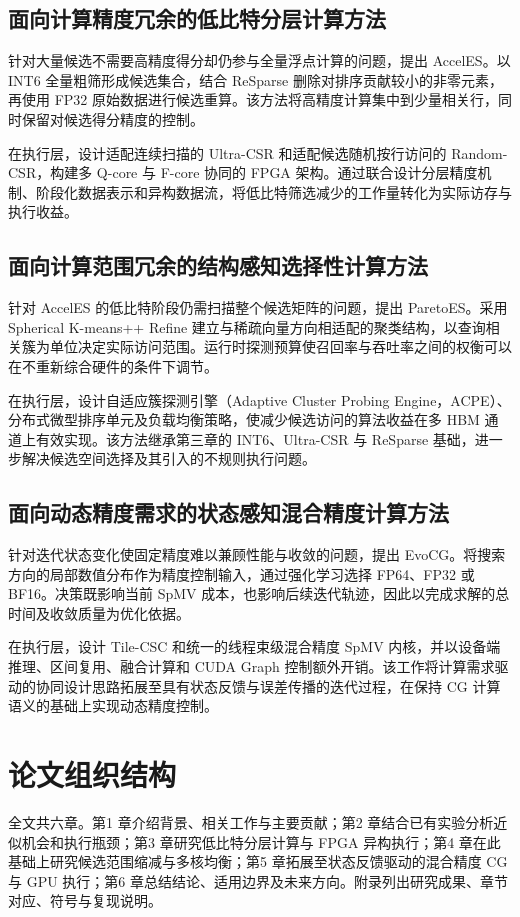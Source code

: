 \subsection{面向计算精度冗余的低比特分层计算方法}
针对大量候选不需要高精度得分却仍参与全量浮点计算的问题，提出 AccelES\cite{jqzhai2025AccelES}。以 INT6 全量粗筛形成候选集合，结合 ReSparse 删除对排序贡献较小的非零元素，再使用 FP32 原始数据进行候选重算。该方法将高精度计算集中到少量相关行，同时保留对候选得分精度的控制。

在执行层，设计适配连续扫描的 Ultra-CSR 和适配候选随机按行访问的 Random-CSR，构建多 Q-core 与 F-core 协同的 FPGA 架构。通过联合设计分层精度机制、阶段化数据表示和异构数据流，将低比特筛选减少的工作量转化为实际访存与执行收益。

\subsection{面向计算范围冗余的结构感知选择性计算方法}
针对 AccelES 的低比特阶段仍需扫描整个候选矩阵的问题，提出 ParetoES\cite{paretoes2026}。采用 Spherical K-means++ Refine 建立与稀疏向量方向相适配的聚类结构，以查询相关簇为单位决定实际访问范围。运行时探测预算使召回率与吞吐率之间的权衡可以在不重新综合硬件的条件下调节。

在执行层，设计自适应簇探测引擎（Adaptive Cluster Probing Engine，ACPE）、分布式微型排序单元及\hbalance{}负载均衡策略，使减少候选访问的算法收益在多 HBM 通道上有效实现。该方法继承第三章的 INT6、Ultra-CSR 与 ReSparse 基础，进一步解决候选空间选择及其引入的不规则执行问题。

\subsection{面向动态精度需求的状态感知混合精度计算方法}
针对迭代状态变化使固定精度难以兼顾性能与收敛的问题，提出 EvoCG\cite{evocg2027}。将搜索方向的局部数值分布作为精度控制输入，通过强化学习选择 FP64、FP32 或 BF16。决策既影响当前 SpMV 成本，也影响后续迭代轨迹，因此以完成求解的总时间及收敛质量为优化依据。

在执行层，设计 Tile-CSC 和统一的线程束级混合精度 SpMV 内核，并以设备端推理、区间复用、融合计算和 CUDA Graph 控制额外开销。该工作将计算需求驱动的协同设计思路拓展至具有状态反馈与误差传播的迭代过程，在保持 CG 计算语义的基础上实现动态精度控制。

\section{论文组织结构}
全文共六章。第1 章介绍背景、相关工作与主要贡献；第2 章结合已有实验分析近似机会和执行瓶颈；第3 章研究低比特分层计算与 FPGA 异构执行；第4 章在此基础上研究候选范围缩减与多核均衡；第5 章拓展至状态反馈驱动的混合精度 CG 与 GPU 执行；第6 章总结结论、适用边界及未来方向。附录列出研究成果、章节对应、符号与复现说明。
